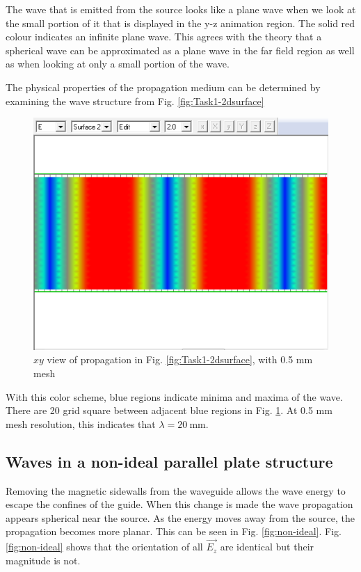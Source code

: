 The wave that is emitted from the source looks like a plane wave when we look at the small portion of it that is displayed in the y-z animation region.
The solid red colour indicates an infinite plane wave.
This agrees with the theory that a spherical wave can be approximated as a plane wave in the far field region as well as when looking at only a small portion of the wave. 

The physical properties of the propagation medium can be determined by examining the wave structure from Fig. \ref{fig:Task1-2dsurface}

\begin{figure}[tbph]
	\centering
	\includegraphics[width=0.7\linewidth]{graphics/Task1-scale}
	\caption{$xy$ view of propagation in Fig. \ref{fig:Task1-2dsurface}, with 0.5 mm mesh}
	\label{fig:Task1-scale}
\end{figure}

With this color scheme, blue regions indicate minima and maxima of the wave.
There are 20 grid square between adjacent blue regions in Fig. \ref{fig:Task1-scale}.
At 0.5 mm mesh resolution, this indicates that $\lambda = \SI{20}{\milli\meter}$.

\subsection{Waves in a non-ideal parallel plate structure}\label{sec:non-ideal}
Removing the magnetic sidewalls from the waveguide allows the wave energy to escape the confines of the guide.
When this change is made the wave propagation appears spherical near the source.
As the energy moves away from the source, the propagation becomes more planar.
This can be seen in Fig. \ref{fig:non-ideal}.
Fig. \ref{fig:non-ideal} shows that the orientation of all $\vec{E_z}$ are identical but their magnitude is not.

